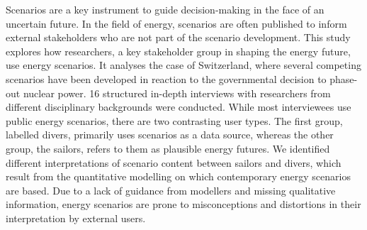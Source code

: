 Scenarios are a key instrument to guide decision-making in the face of an uncertain future. In the field of energy, scenarios are often published to inform external stakeholders who are not part of the scenario development. This study explores how researchers, a key stakeholder group in shaping the energy future, use energy scenarios. It analyses the case of Switzerland, where several competing scenarios have been developed in reaction to the governmental decision to phase-out nuclear power. 16 structured in-depth interviews with researchers from different disciplinary backgrounds were conducted. While most interviewees use public energy scenarios, there are two contrasting user types. The first group, labelled divers, primarily uses scenarios as a data source, whereas the other group, the sailors, refers to them as plausible energy futures. We identified different interpretations of scenario content between sailors and divers, which result from the quantitative modelling on which contemporary energy scenarios are based. Due to a lack of guidance from modellers and missing qualitative information, energy scenarios are prone to misconceptions and distortions in their interpretation by external users.